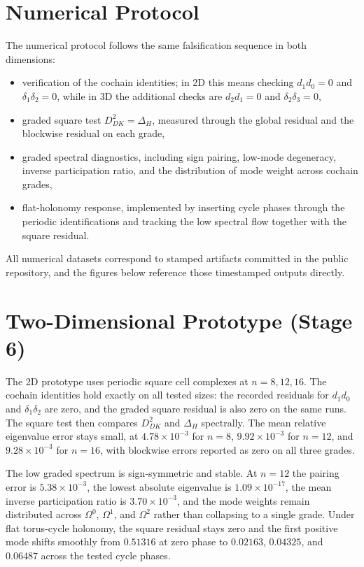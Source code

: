 \documentclass[11pt]{article}
\begin{document}
\section{Numerical Protocol}
The numerical protocol follows the same falsification sequence in both dimensions:
\begin{itemize}
\item verification of the cochain identities; in 2D this means checking $d_1 d_0 = 0$ and $\delta_1 \delta_2 = 0$, while in 3D the additional checks are $d_2 d_1 = 0$ and $\delta_2 \delta_3 = 0$,
\item graded square test $D_{DK}^2 = \Delta_H$, measured through the global residual and the blockwise residual on each grade,
\item graded spectral diagnostics, including sign pairing, low-mode degeneracy, inverse participation ratio, and the distribution of mode weight across cochain grades,
\item flat-holonomy response, implemented by inserting cycle phases through the periodic identifications and tracking the low spectral flow together with the square residual.
\end{itemize}
All numerical datasets correspond to stamped artifacts committed in the public repository, and the figures below reference those timestamped outputs directly.

\section{Two-Dimensional Prototype (Stage 6)}
The 2D prototype uses periodic square cell complexes at $n = 8, 12, 16$. The cochain identities hold exactly on all tested sizes: the recorded residuals for $d_1 d_0$ and $\delta_1 \delta_2$ are zero, and the graded square residual is also zero on the same runs. The square test then compares $D_{DK}^2$ and $\Delta_H$ spectrally. The mean relative eigenvalue error stays small, at $4.78 \times 10^{-3}$ for $n=8$, $9.92 \times 10^{-3}$ for $n=12$, and $9.28 \times 10^{-3}$ for $n=16$, with blockwise errors reported as zero on all three grades.

The low graded spectrum is sign-symmetric and stable. At $n=12$ the pairing error is $5.38 \times 10^{-3}$, the lowest absolute eigenvalue is $1.09 \times 10^{-17}$, the mean inverse participation ratio is $3.70 \times 10^{-3}$, and the mode weights remain distributed across $\Omega^0$, $\Omega^1$, and $\Omega^2$ rather than collapsing to a single grade. Under flat torus-cycle holonomy, the square residual stays zero and the first positive mode shifts smoothly from $0.51316$ at zero phase to $0.02163$, $0.04325$, and $0.06487$ across the tested cycle phases.
\end{document}
